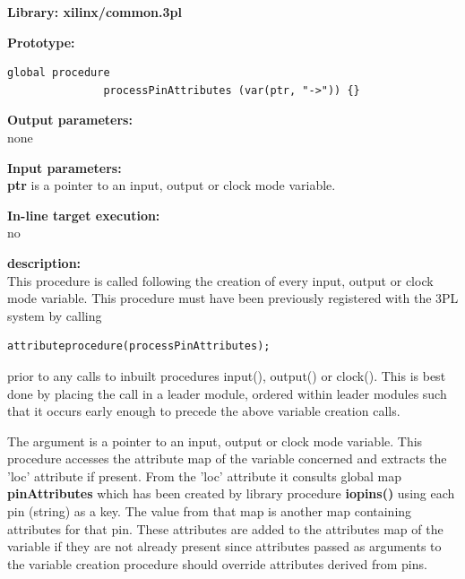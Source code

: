             {\bf Library: xilinx/common.3pl}

            {\bf Prototype:} \\
            \vsp
            \begin{lstlisting}[gobble=12, language=threepl]
               global procedure
               processPinAttributes (var(ptr, "->")) {}
            \end{lstlisting}

            {\bf Output parameters:} \\
            none

            {\bf Input parameters:} \\            
            {\bf ptr} is a pointer to an input, output or clock mode variable.
        
            {\bf In-line target execution:} \\
            no

            {\bf description:} \\
            
            This procedure is called following the creation of every input, output
            or clock mode variable. This procedure must have been previously
            registered with the 3PL system by calling
            
            \begin{lstlisting}[gobble=12, language=threepl]
               attributeprocedure(processPinAttributes);
            \end{lstlisting}
            
            prior to any calls to inbuilt procedures input(), output() or clock().
            This is best done by placing the call in a leader module, ordered
            within leader modules such that it occurs early enough to precede the
            above variable creation calls. 
        
            The argument is a pointer to an input, output or clock mode variable.
            This procedure accesses the attribute map of the variable concerned and
            extracts the 'loc' attribute if present. From the 'loc' attribute it
            consults global map {\bf pinAttributes} which has been created by
            library procedure {\bf iopins()}  using each pin
            (string) as a key. The value from that map is another map containing
            attributes for that pin. These attributes are added to the attributes
            map of the variable if they are not already present since attributes
            passed as arguments to the variable creation procedure should override
            attributes derived from pins.
            

